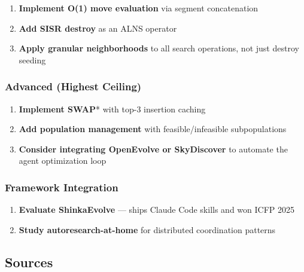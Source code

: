 \documentclass[twocolumn,10pt,letterpaper]{article}
\begin{document}
\begin{enumerate}
\setlength{\itemsep}{0pt}
\setlength{\parskip}{0pt}
  \item \textbf{Implement O(1) move evaluation} via segment concatenation
  \item \textbf{Add SISR destroy} as an ALNS operator
  \item \textbf{Apply granular neighborhoods} to all search operations, not just destroy seeding
\end{enumerate}

\subsubsection{Advanced (Highest Ceiling)}

\begin{enumerate}
\setlength{\itemsep}{0pt}
\setlength{\parskip}{0pt}
  \item \textbf{Implement SWAP}* with top-3 insertion caching
  \item \textbf{Add population management} with feasible/infeasible subpopulations
  \item \textbf{Consider integrating OpenEvolve or SkyDiscover} to automate the agent optimization loop
\end{enumerate}

\subsubsection{Framework Integration}

\begin{enumerate}
\setlength{\itemsep}{0pt}
\setlength{\parskip}{0pt}
  \item \textbf{Evaluate ShinkaEvolve} --- ships Claude Code skills and won ICFP 2025
  \item \textbf{Study autoresearch-at-home} for distributed coordination patterns
\end{enumerate}

\subsection{Sources}
\end{document}
